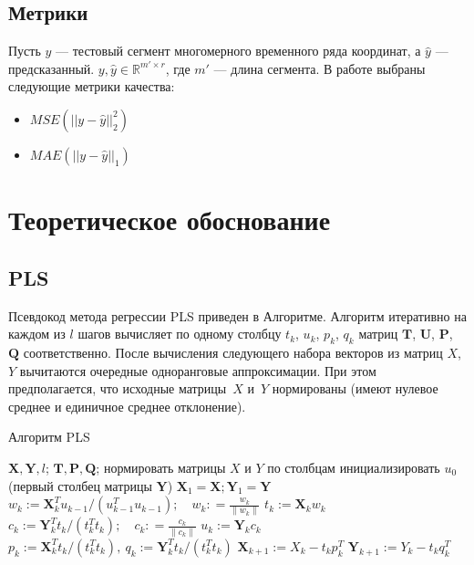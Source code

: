 \documentclass{article}
\begin{document}
\subsection{Метрики}
Пусть $y$ ---  тестовый сегмент многомерного временного ряда координат, а $\hat{y}$ --- предсказанный.  $y, \hat{y} \in \mathbb{R}^{m' \times r}$, где $m'$ --- длина сегмента. В работе выбраны следующие метрики качества:
\begin{itemize}
    \item $MSE(||y-\hat y||_2^2 )$
    \item $MAE(||y-\hat y||_1)$
    
\end{itemize}


\section{Теоретическое обоснование}
\subsection{PLS}
Псевдокод метода регрессии PLS приведен в Алгоритме.
Алгоритм итеративно на каждом из $l$ шагов вычисляет по одному столбцу $t_k$, $u_k$, $p_k$, $q_k$ матриц $\mathbf{T}$, $\mathbf{U}$, $\mathbf{P}$, $\mathbf{Q}$ соответственно. 
После вычисления следующего набора векторов из матриц $X$, $Y$ вычитаются очередные одноранговые аппроксимации. 
При этом предполагается, что исходные матрицы~$X$ и~$Y$ нормированы (имеют нулевое среднее и единичное среднее отклонение).

\begin{algorithm}[h]
	\caption{Алгоритм PLS}
	\label{ch1:pls_pseudocode}
	\begin{algorithmic}[1]
		\REQUIRE $\mathbf{X}, \mathbf{Y}, l$;
		\ENSURE $\mathbf{T}, \mathbf{P}, \mathbf{Q}$;
		\STATE нормировать матрицы $X$ и $Y$ по столбцам
		\STATE инициализировать $u_0$ (первый столбец матрицы $\mathbf{Y}$)
		\STATE $\mathbf{X}_1 = \mathbf{X}; \mathbf{Y}_1 = \mathbf{Y}$
		\REPEAT
		\vspace{0.1cm}
		\STATE $w_k := \mathbf{X}_k^{T} u_{k-1} / (u_{k-1}^{T} u_{k-1}); \quad w_k: = \frac{w_k}{\| w_k \|}$
		\vspace{0.1cm}
		\STATE $t_k := \mathbf{X}_k w_k$
		\vspace{0.1cm}
		\STATE $c_k := \mathbf{Y}_k^{T} t_k / (t_k^{T} t_k); \quad c_k: = \frac{c_k}{\| c_k \|}$
		\vspace{0.1cm}
		\STATE $u_k := \mathbf{Y}_k c_k$
		\vspace{0.1cm}
		\STATE $p_k:= \mathbf{X}_k^{T}t_k/(t_k^{T}t_k),\ 
		q_k := \mathbf{Y}_k^{T}t_k/(t_k^{T}t_k)$
		\vspace{0.2cm}
		\STATE $\mathbf{X}_{k+1} :=  X_k - t_k p_k^{T}$
		\vspace{0.2cm}
		\STATE $\mathbf{Y}_{k + 1} :=  Y_k - t_k q_k^{T}$ 
		\ENDFOR
	\end{algorithmic}
\end{algorithm}
\end{document}
